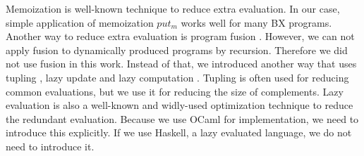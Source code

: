 Memoization \cite{Bellman:2003:DP:862270,MICHIE1968} is well-known technique to reduce extra evaluation. In our case, simple application of memoization $put_m$ works well for many BX programs.
Another way to reduce extra evaluation is program fusion \cite{Wadler:1988:DTP:80099.80104}. However, we can not apply fusion to dynamically produced programs by recursion. Therefore we did not use fusion in this work.
  Instead of that, we introduced another way that uses tupling \cite{Fokkinga90}, lazy update and lazy computation \cite{Henderson:1976:LE:800168.811543, Hudak:2007:HHL:1238844.1238856}. Tupling is often used for reducing common evaluations, but we use it for reducing the size of complements.
  Lazy evaluation is also a well-known and widly-used optimization technique to reduce the redundant evaluation. Because we use OCaml for implementation, we need to introduce this explicitly. If we use Haskell, a lazy evaluated language, we do not need to introduce it.






